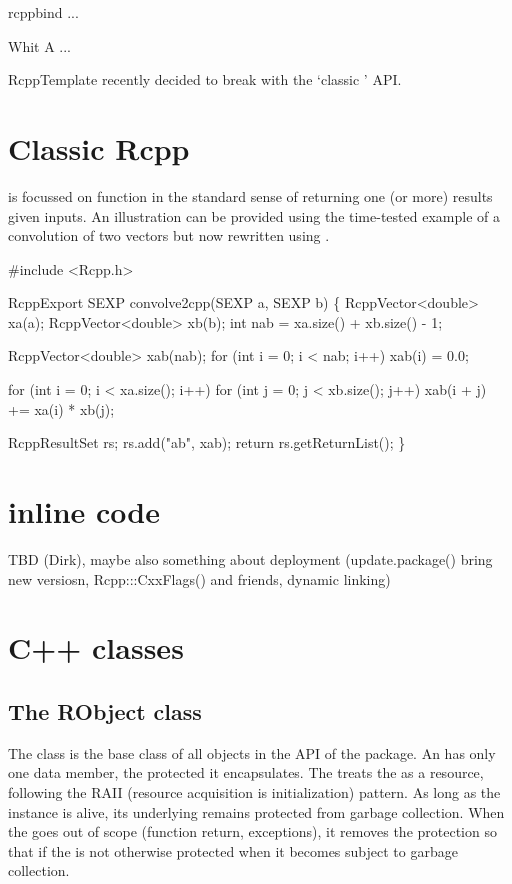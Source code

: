 rcppbind ...

Whit A ...

RcppTemplate recently decided to break with the `classic '  API.


\section{Classic Rcpp}
\label{sec:classic_rcpp}

 is focussed on function in the standard sense of returning one (or
more) results given inputs. An illustration can be provided using the
time-tested example of a convolution of two vectors \citep{R:exts} but now
rewritten using .

\begin{example}
#include <Rcpp.h>

RcppExport SEXP convolve2cpp(SEXP a, SEXP b) \{
  RcppVector<double> xa(a);
  RcppVector<double> xb(b);
  int nab = xa.size() + xb.size() - 1;

  RcppVector<double> xab(nab);
  for (int i = 0; i < nab; i++) xab(i) = 0.0;

  for (int i = 0; i < xa.size(); i++)
    for (int j = 0; j < xb.size(); j++) 
       xab(i + j) += xa(i) * xb(j);

  RcppResultSet rs;
  rs.add("ab", xab);
  return rs.getReturnList();
\}
\end{example}

\section{inline code}

TBD (Dirk), maybe also something about deployment (update.package() bring new
versiosn, Rcpp:::CxxFlags() and friends, dynamic linking)

\section{ C++ classes}
\label{sec:new_rcpp}

\subsection{The RObject class}

The  class is the base class of all objects in the 
API of the  package. An  has only one 
data member, the protected  it encapsulates. 
The  treats the  as a resource, following the
RAII (resource acquisition is initialization) pattern. As long as the 
 instance is alive, its underlying  remains 
protected from garbage collection. When the  goes out 
of scope (function return, exceptions), it removes the protection so that 
if the  is not otherwise protected when it becomes subject to 
garbage collection. 

